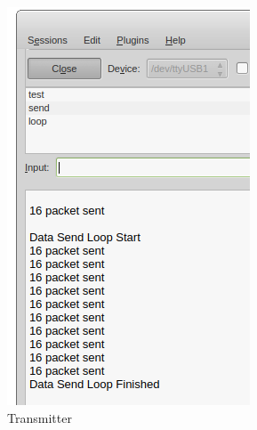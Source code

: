 \documentclass{book} %
\begin{document}
	\begin{figure}[!ht]
		\centering
		\begin{subfigure}{0.4\textwidth}
			\includegraphics[width=\textwidth]{images/lorasend.png}
			\caption{Transmitter}
		\end{subfigure}
		\begin{subfigure}{0.4\textwidth}

\end{subfigure}
\end{figure}
\end{document}
